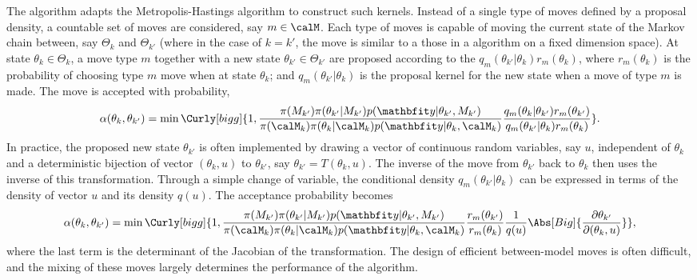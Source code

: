 The \rjmcmc algorithm adapts the Metropolis-Hastings algorithm to construct
such kernels. Instead of a single type of moves defined by a proposal density,
a countable set of moves are considered, say $m\in\calM$. Each type of moves
is capable of moving the current state of the Markov chain between, say
$\Theta_k$ and $\Theta_{k'}$ (where in the case of $k = k'$, the move is
similar to a those in a \mcmc algorithm on a fixed dimension space). At state
$\theta_k\in\Theta_k$, a move type $m$ together with a new state
$\theta_{k'}\in\Theta_{k'}$ are proposed according to the
$q_m(\theta_{k'}|\theta_k)r_m(\theta_k)$, where $r_m(\theta_k)$ is the
probability of choosing type $m$ move when at state $\theta_k$; and
$q_m(\theta_{k'}|\theta_k)$ is the proposal kernel for the new state when a
move of type $m$ is made. The move is accepted with probability,
\begin{equation}
  \alpha(\theta_k,\theta_{k'}) =
  \min\Curly[bigg]{1,
    \frac{\pi(M_{k'})\pi(\theta_{k'}|M_{k'})p(\data|\theta_{k'},M_{k'})}
    {\pi(\calM_k)\pi(\theta_k|\calM_k)p(\data|\theta_k,\calM_k)}
    \frac{q_m(\theta_k|\theta_{k'})r_m(\theta_{k'})}
    {q_m(\theta_{k'}|\theta_k)r_m(\theta_k)}
  }.
\end{equation}
In practice, the proposed new state $\theta_{k'}$ is often implemented by
drawing a vector of continuous random variables, say $u$, independent of
$\theta_k$ and a deterministic bijection of vector $(\theta_k,u)$ to
$\theta_{k'}$, say $\theta_{k'} = T(\theta_k,u)$. The inverse of the move from
$\theta_{k'}$ back to $\theta_k$ then uses the inverse of this transformation.
Through a simple change of variable, the conditional density
$q_m(\theta_{k'}|\theta_k)$ can be expressed in terms of the density of vector
$u$ and its density $q(u)$. The acceptance probability becomes
\begin{equation}
  \alpha(\theta_k,\theta_{k'}) =
  \min\Curly[bigg]{1,
    \frac{\pi(M_{k'})\pi(\theta_{k'}|M_{k'})p(\data|\theta_{k'},M_{k'})}
    {\pi(\calM_k)\pi(\theta_k|\calM_k)p(\data|\theta_k,\calM_k)}
    \frac{r_m(\theta_{k'})}{r_m(\theta_k)}
    \frac{1}{q(u)}\Abs[Big]{\frac{\partial\theta_{k'}}{\partial(\theta_k,u)}}
  },
\end{equation}
where the last term is the determinant of the Jacobian of the transformation.
The design of efficient between-model moves is often difficult, and the mixing
of these moves largely determines the performance of the algorithm.


